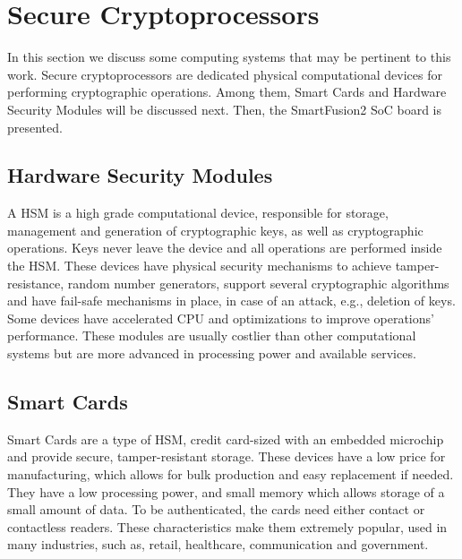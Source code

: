\section{Secure Cryptoprocessors}\label{chap:background:cryptoprocessors}

In this section we discuss some computing systems that may be pertinent to this work. 
Secure cryptoprocessors are dedicated physical computational devices for performing cryptographic operations. Among them, Smart Cards and Hardware Security Modules will be discussed next. Then, the SmartFusion2 \ac{SoC} board is presented.

\subsection{Hardware Security Modules}\label{chap:background:computing:hsm}

A \ac{HSM} is a high grade computational device, responsible for storage, management and generation of cryptographic keys, as well as cryptographic operations. Keys never leave the device and all operations are performed inside the \ac{HSM}. These devices have physical security mechanisms to achieve tamper-resistance, random number generators, support several cryptographic algorithms and have fail-safe mechanisms in place, in case of an attack, e.g., deletion of keys. Some devices have accelerated \ac{CPU} and optimizations to improve operations' performance.
These modules are usually costlier than other computational systems but are more advanced in processing power and available services.

\subsection{Smart Cards}\label{chap:background:computing:smartcards}
Smart Cards are a type of \ac{HSM}, credit card-sized with an embedded microchip and provide secure, tamper-resistant storage. These devices have a low price for manufacturing, which allows for bulk production and easy replacement if needed. They have a low processing power, and small memory which allows storage of a small amount of data. To be authenticated, the cards need either contact or contactless readers. These characteristics make them extremely popular, used in many industries, such as, retail, healthcare, communication and government.

